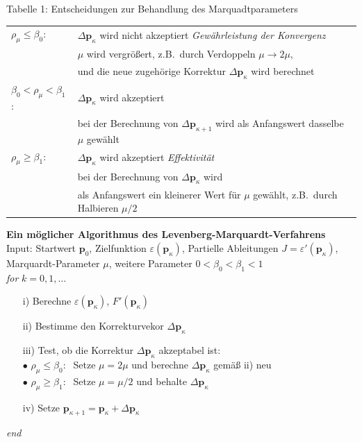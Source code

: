 Tabelle 1: Entscheidungen zur Behandlung des Marquadtparameters

\begin{tabular}{ll}
\hline\hline
$\rho_{\mu} \le \beta_0 $: &
$\Delta \mathbf{p}_\kappa$ wird nicht akzeptiert \textsl{Gewährleistung der Konvergenz} \\
 & $\mu$ wird vergrößert, z.B.\ durch Verdoppeln  $\mu \rightarrow 2 \mu$,\\
 & und die neue zugehörige Korrektur $\Delta \mathbf{p}_\kappa$ wird berechnet\\
\hline
$\beta_0 < \rho_{\mu} < \beta_1$: & $\Delta \mathbf{p}_\kappa$ wird akzeptiert \\
 & bei der Berechnung von $\Delta \mathbf{p}_{\kappa+1}$
  wird als Anfangswert dasselbe $\mu$ gewählt \\
\hline
$\rho_{\mu} \ge \beta_1$: & $\Delta \mathbf{p}_\kappa$ wird akzeptiert \textsl{Effektivität}\\
 & bei der Berechnung  von $\Delta \mathbf{p}_\kappa$ wird \\
 & als Anfangswert ein kleinerer Wert für $\mu$ gewählt, z.B.\ durch Halbieren $\mu / 2$ \\
\hline\hline
\end{tabular}

\newpage
\textbf{Ein möglicher Algorithmus des Levenberg-Marquardt-Verfahrens} \\
Input: Startwert $\mathbf{p}_0$, Zielfunktion $\varepsilon(\mathbf{p}_{\kappa})$, Partielle Ableitungen $J=\varepsilon'(\mathbf{p}_{\kappa})$, Marquardt-Parameter $\mu$, weitere Parameter $0 < \beta_0 < \beta_1 < 1$  \\
\hspace*{1em} \textit{for} $k = 0,1, \ldots$
\begin{itemize}
	\item[i)] Berechne $\varepsilon(\mathbf{p}_{\kappa})$, $F'(\mathbf{p}_{\kappa})$
	\item[ii)] Bestimme den Korrekturvekor $\Delta \mathbf{p}_\kappa$
	\item[iii)] Test, ob die Korrektur $\Delta \mathbf{p}_\kappa$  akzeptabel ist: \\
	$\bullet$ $\rho_{\mu} \le \beta_0: \;$ Setze $\mu = 2 \mu $ und berechne $ \Delta \mathbf{p}_\kappa$ gemäß ii) neu \\
	$\bullet$  $\rho_{\mu} \ge \beta_1: \;$ Setze $\mu = \mu / 2 $ und behalte
	$\Delta \mathbf{p}_\kappa$
	\item[iv)] Setze $\mathbf{p}_{\kappa +1} = \mathbf{p}_\kappa +  \Delta \mathbf{p}_\kappa $
\end{itemize}
\hspace*{1em} \textit{end} \\


